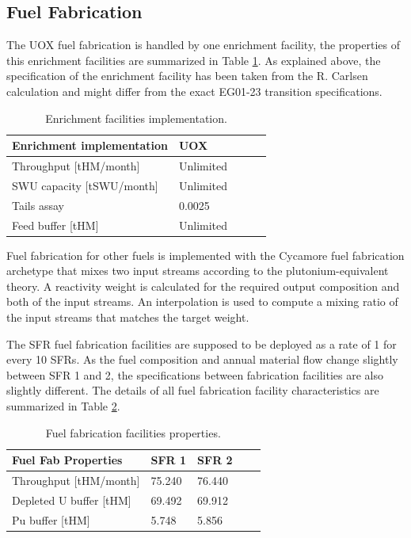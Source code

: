 \documentclass[12pt]{article}
\begin{document}
\subsection{Fuel Fabrication}

The UOX fuel fabrication is handled by one enrichment facility, the properties
of this enrichment facilities are summarized in Table \ref{tab:enrich_1}. As
explained above, the specification of the enrichment facility has been taken from the
R. Carlsen calculation and might differ from the exact EG01-23 transition
specifications. 

\begin{table}[h!]
    \centering
    \begin{tabular}{lllll}
    \hline
    Enrichment implementation  &  UOX        \\
    \hline
    Throughput [tHM/month]     &  Unlimited  \\
    SWU capacity [tSWU/month]  &  Unlimited  \\
    Tails assay                &  0.0025     \\
    Feed buffer [tHM]          &  Unlimited  \\
    \hline
    \end{tabular}
    \caption{Enrichment facilities implementation. }
    \label{tab:enrich_1}
\end{table}

Fuel fabrication for other fuels is implemented with the Cycamore fuel
fabrication archetype that mixes two
input streams according to the plutonium-equivalent theory\cite{Pueq}. A
reactivity weight is calculated for the required output composition and both of
the input streams. An interpolation is used to compute a mixing ratio of the input
streams that matches the target weight.


The SFR fuel fabrication facilities are supposed to be deployed as a rate of 1
for every 10 SFRs.  As the fuel composition and annual material flow change slightly
between SFR 1 and 2, the specifications between fabrication facilities are also slightly
different. The details of all fuel fabrication facility characteristics are
summarized in Table \ref{tab:fuelfab_1}.

\begin{table}[h!]
    \centering
    \begin{tabular}{lllll}
    \hline
    Fuel Fab Properties      &  SFR 1   &  SFR 2   \\
    \hline
    Throughput [tHM/month]   &  75.240  &  76.440  \\
    Depleted U buffer [tHM]  &  69.492  &  69.912  \\
    Pu buffer  [tHM]         &  5.748   &  5.856   \\
    \hline
    \end{tabular}
    \caption{Fuel fabrication facilities properties.}
    \label{tab:fuelfab_1}
\end{table}
\end{document}
